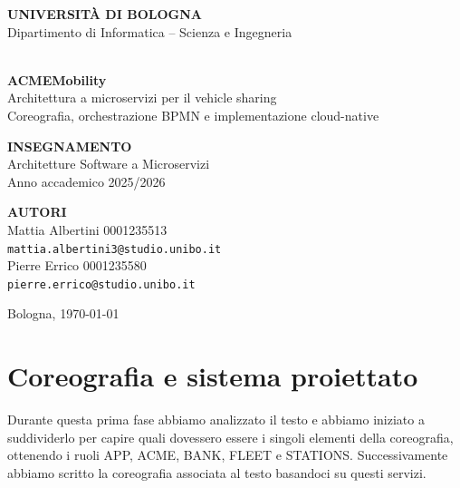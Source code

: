 \documentclass[12pt,a4paper,twoside]{report}
\newcommand{\capitoloNum}[1]{\chapter{#1}}
\begin{document}
\begin{titlepage}
  \thispagestyle{empty}
  \begin{flushleft}
    {\small\bfseries\color{acmeblue}\MakeUppercase{Università di Bologna}}\\[0.35em]
    {\small Dipartimento di Informatica -- Scienza e Ingegneria}
  \end{flushleft}

  \vspace{2.2cm}
  \noindent{\color{acmeblue}\rule{\textwidth}{1.2pt}}\\[1.1cm]
  {\fontsize{34}{39}\selectfont\bfseries\color{acmeblue} ACMEMobility}\\[0.55cm]
  {\Large Architettura a microservizi per il vehicle sharing}\\[0.35cm]
  {\large Coreografia, orchestrazione BPMN e implementazione cloud-native}
  \\[1.1cm]
  \noindent{\color{acmeblue}\rule{0.34\textwidth}{0.6pt}}

  \vfill
  \begin{minipage}[t]{0.47\textwidth}
    {\small\color{acmeblue}\bfseries INSEGNAMENTO}\\[0.35em]
    Architetture Software a Microservizi\\
    Anno accademico 2025/2026
  \end{minipage}
  \hfill
  \begin{minipage}[t]{0.47\textwidth}
    {\small\color{acmeblue}\bfseries AUTORI}\\[0.35em]
    Mattia Albertini \hfill 0001235513\\
    \texttt{mattia.albertini3@studio.unibo.it}\\[0.7em]
    Pierre Errico \hfill 0001235580\\
    \texttt{pierre.errico@studio.unibo.it}
  \end{minipage}

  \vspace{1.7cm}
  {\small Bologna, \today}
\end{titlepage}
\tableofcontents
\clearpage
{}

\capitoloNum{Coreografia e sistema proiettato}

Durante questa prima fase abbiamo analizzato il testo e abbiamo iniziato a
suddividerlo per capire quali dovessero essere i singoli elementi della
coreografia, ottenendo i ruoli APP, ACME, BANK, FLEET e STATIONS. Successivamente
abbiamo scritto la coreografia associata al testo basandoci su questi servizi.
\end{document}
